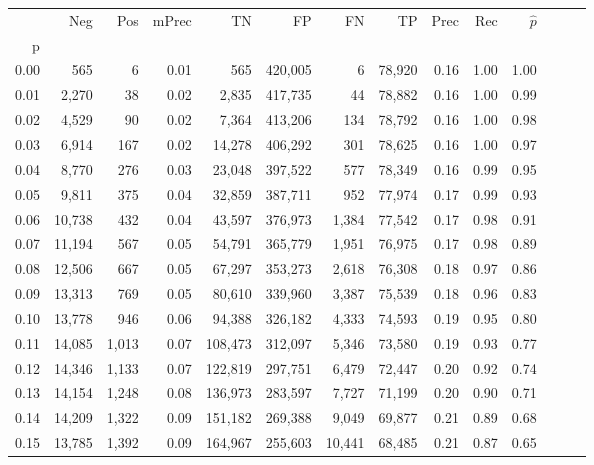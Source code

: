 \begin{tabular}{rrrrrrrrrrrrrr}
\toprule
{} &     Neg &    Pos & mPrec &       TN &       FP &      FN &      TP &  Prec &   Rec & $\hat{p}$ \\
p    &         &        &       &          &          &         &         &       &       &           \\
\midrule
0.00 &     565 &      6 &  0.01 &      565 &  420,005 &       6 &  78,920 &  0.16 &  1.00 &      1.00 \\
0.01 &   2,270 &     38 &  0.02 &    2,835 &  417,735 &      44 &  78,882 &  0.16 &  1.00 &      0.99 \\
0.02 &   4,529 &     90 &  0.02 &    7,364 &  413,206 &     134 &  78,792 &  0.16 &  1.00 &      0.98 \\
0.03 &   6,914 &    167 &  0.02 &   14,278 &  406,292 &     301 &  78,625 &  0.16 &  1.00 &      0.97 \\
0.04 &   8,770 &    276 &  0.03 &   23,048 &  397,522 &     577 &  78,349 &  0.16 &  0.99 &      0.95 \\
0.05 &   9,811 &    375 &  0.04 &   32,859 &  387,711 &     952 &  77,974 &  0.17 &  0.99 &      0.93 \\
0.06 &  10,738 &    432 &  0.04 &   43,597 &  376,973 &   1,384 &  77,542 &  0.17 &  0.98 &      0.91 \\
0.07 &  11,194 &    567 &  0.05 &   54,791 &  365,779 &   1,951 &  76,975 &  0.17 &  0.98 &      0.89 \\
0.08 &  12,506 &    667 &  0.05 &   67,297 &  353,273 &   2,618 &  76,308 &  0.18 &  0.97 &      0.86 \\
0.09 &  13,313 &    769 &  0.05 &   80,610 &  339,960 &   3,387 &  75,539 &  0.18 &  0.96 &      0.83 \\
0.10 &  13,778 &    946 &  0.06 &   94,388 &  326,182 &   4,333 &  74,593 &  0.19 &  0.95 &      0.80 \\
0.11 &  14,085 &  1,013 &  0.07 &  108,473 &  312,097 &   5,346 &  73,580 &  0.19 &  0.93 &      0.77 \\
0.12 &  14,346 &  1,133 &  0.07 &  122,819 &  297,751 &   6,479 &  72,447 &  0.20 &  0.92 &      0.74 \\
0.13 &  14,154 &  1,248 &  0.08 &  136,973 &  283,597 &   7,727 &  71,199 &  0.20 &  0.90 &      0.71 \\
0.14 &  14,209 &  1,322 &  0.09 &  151,182 &  269,388 &   9,049 &  69,877 &  0.21 &  0.89 &      0.68 \\
0.15 &  13,785 &  1,392 &  0.09 &  164,967 &  255,603 &  10,441 &  68,485 &  0.21 &  0.87 &      0.65 \\

\end{tabular}
